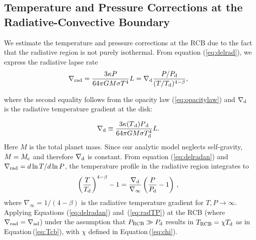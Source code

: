 \documentclass[apj, numberedappendix]{emulateapj}
\newcommand{\Eq}[1]{Equation\,(\ref{#1})}
\newcommand{\Eqs}[2]{Equations (\ref{#1}) and~(\ref{#2})}
\newcommand{\delad}{\nabla_{\rm ad}}
\newcommand{\delrad}{\nabla_{\rm rad}}
\newcommand{\co}{_{\rm c}}
\newcommand{\di}{_{\rm d}}
\newcommand{\cb}{_{\rm RCB}}
\begin{document}
\subsection{Temperature and Pressure Corrections at the Radiative-Convective Boundary}
\label{RCBcorr}

We estimate the temperature and pressure corrections at the RCB due to the fact that the radiative region is not purely isothermal. From equation (\ref{eq:delrad}), we express the radiative lapse rate
\begin{equation}\label{eq:delradan}
\delrad = {3 \kappa P \over 64 \pi  G M \sigma T^4} L = \nabla\di {P/P_{\rm d} \over (T/T_{\rm d})^{4-\beta}},
\end{equation}

\noindent where the second equality follows from the opacity law (\ref{eq:opacitylaw}) and $\nabla_{\rm d}$ is the radiative temperature gradient at the disk:

\begin{equation}
\label{eq:delo}
\nabla \di \equiv \frac{3 \kappa(T{\di}) P{\di}}{64 \pi G M \sigma T_{\rm d}^4} L.
\end{equation}
Here $M$ is the total planet mass. Since our analytic model neglects self-gravity, $M=M\co$ and therefore $\nabla\di$ is constant. From equation (\ref{eq:delradan}) and $\delrad=d \ln T / d\ln P$, the temperature profile in the radiative region integrates to
\begin{equation}\label{eq:radTP}
\left(T \over T_{\rm d}\right)^{4-\beta} - 1 = {\nabla\di \over \nabla_\infty} \left( {P \over P_{\rm d}} - 1 \right) \, ,
\end{equation} 
where $\nabla_\infty = 1/(4-\beta)$ is the radiative temperature gradient for $T ,P \rightarrow \infty$.
Applying \Eqs{eq:delradan}{eq:radTP} at the RCB (where $\delrad = \delad$) under the assumption that $P\cb \gg P_{\rm d}$ results in  $T\cb=\chi T\di$ as in \Eq{eq:Tcb}, with $\chi$ defined in \Eq{eq:chi}.
\end{document}
